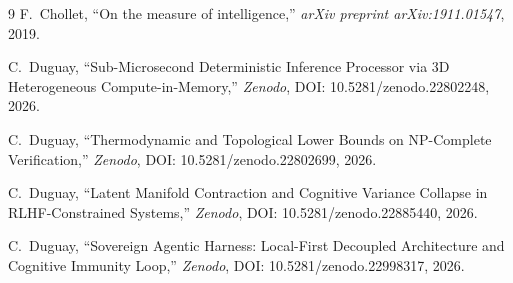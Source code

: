 \documentclass[11pt,a4paper]{article}
\begin{document}
\begin{thebibliography}{9}
F.~Chollet, ``On the measure of intelligence,'' \textit{arXiv preprint arXiv:1911.01547}, 2019.

C.~Duguay, ``Sub-Microsecond Deterministic Inference Processor via 3D Heterogeneous Compute-in-Memory,'' \textit{Zenodo}, DOI: 10.5281/zenodo.22802248, 2026.

C.~Duguay, ``Thermodynamic and Topological Lower Bounds on NP-Complete Verification,'' \textit{Zenodo}, DOI: 10.5281/zenodo.22802699, 2026.

C.~Duguay, ``Latent Manifold Contraction and Cognitive Variance Collapse in RLHF-Constrained Systems,'' \textit{Zenodo}, DOI: 10.5281/zenodo.22885440, 2026.

C.~Duguay, ``Sovereign Agentic Harness: Local-First Decoupled Architecture and Cognitive Immunity Loop,'' \textit{Zenodo}, DOI: 10.5281/zenodo.22998317, 2026.
\end{thebibliography}
\end{document}
